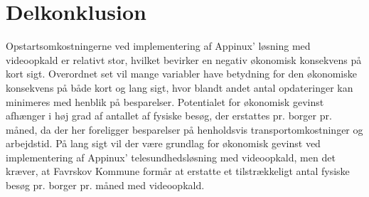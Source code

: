 \section{Delkonklusion}
Opstartsomkostningerne ved implementering af Appinux’ løsning med videoopkald er relativt stor, hvilket bevirker en negativ økonomisk konsekvens på kort sigt. 
Overordnet set vil mange variabler have betydning for den økonomiske konsekvens på både kort og lang sigt, hvor blandt andet antal opdateringer kan minimeres med henblik på besparelser. 
Potentialet for økonomisk gevinst afhænger i høj grad af antallet af fysiske besøg, der erstattes pr. borger pr. måned, da der her foreligger besparelser på henholdsvis transportomkostninger og arbejdstid.
På lang sigt vil der være grundlag for økonomisk gevinst ved implementering af Appinux’ telesundhedsløsning med videoopkald, men det kræver, at Favrskov Kommune formår at erstatte et tilstrækkeligt antal fysiske besøg pr. borger pr. måned med videoopkald.







